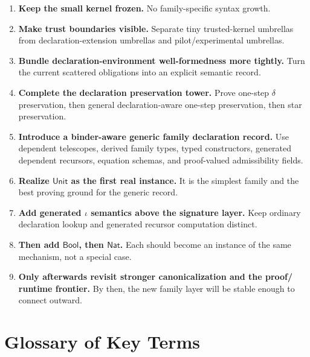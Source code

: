 \documentclass[11pt]{article}
\newcommand{\deltared}{\ensuremath{\delta}}
\newcommand{\iotared}{\ensuremath{\iota}}
\newcommand{\Nat}{\ensuremath{\mathsf{Nat}}}
\newcommand{\Bool}{\ensuremath{\mathsf{Bool}}}
\newcommand{\UnitTy}{\ensuremath{\mathsf{Unit}}}
\begin{document}
\begin{enumerate}[leftmargin=2em]
  \item \textbf{Keep the small kernel frozen.}
  No family-specific syntax growth.

  \item \textbf{Make trust boundaries visible.}
  Separate tiny trusted-kernel umbrellas from declaration-extension umbrellas
  and pilot/experimental umbrellas.

  \item \textbf{Bundle declaration-environment well-formedness more tightly.}
  Turn the current scattered obligations into an explicit semantic record.

  \item \textbf{Complete the declaration preservation tower.}
  Prove one-step $\deltared$ preservation, then general declaration-aware
  one-step preservation, then star preservation.

  \item \textbf{Introduce a binder-aware generic family declaration record.}
  Use dependent telescopes, derived family types, typed constructors, generated
  dependent recursors, equation schemas, and proof-valued admissibility fields.

  \item \textbf{Realize \UnitTy{} as the first real instance.}
  It is the simplest family and the best proving ground for the generic record.

  \item \textbf{Add generated $\iotared$ semantics above the signature layer.}
  Keep ordinary declaration lookup and generated recursor computation distinct.

  \item \textbf{Then add \Bool{}, then \Nat{}.}
  Each should become an instance of the same mechanism, not a special case.

  \item \textbf{Only afterwards revisit stronger canonicalization and the proof/
  runtime frontier.}
  By then, the new family layer will be stable enough to connect outward.
\end{enumerate}

\section{Glossary of Key Terms}
\end{document}
